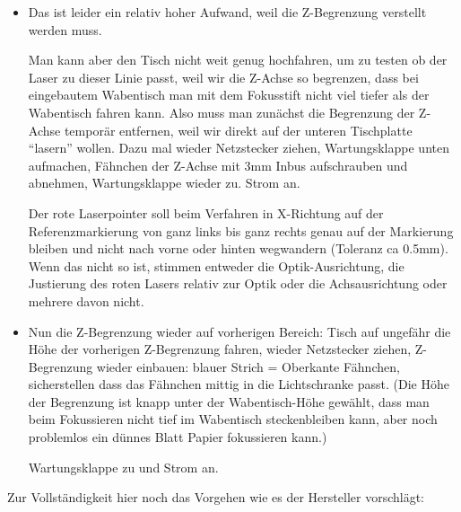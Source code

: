 \documentclass{\basedir/fablab-document}
\begin{document}
	\begin{itemize}
		\item Das ist leider ein relativ hoher Aufwand, weil die Z-Begrenzung verstellt werden muss.
		
		Man kann aber den Tisch nicht weit genug hochfahren, um zu testen ob der Laser zu dieser Linie passt, weil wir die Z-Achse so begrenzen, dass bei eingebautem Wabentisch man mit dem Fokusstift nicht viel tiefer als der Wabentisch fahren kann. Also muss man zunächst die Begrenzung der Z-Achse temporär entfernen, weil wir direkt auf der unteren Tischplatte \enquote{lasern} wollen. Dazu mal wieder Netzstecker ziehen, Wartungsklappe unten aufmachen, Fähnchen der Z-Achse mit 3mm Inbus aufschrauben und abnehmen, Wartungsklappe wieder zu. Strom an.
		
		Der rote Laserpointer soll beim Verfahren in X-Richtung auf der Referenzmarkierung von ganz links bis ganz rechts genau auf der Markierung bleiben und nicht nach vorne oder hinten wegwandern (Toleranz ca 0.5mm). Wenn das nicht so ist, stimmen entweder die Optik-Ausrichtung, die Justierung des roten Lasers relativ zur Optik oder die Achsausrichtung oder mehrere davon nicht.
		
		\item Nun die Z-Begrenzung wieder auf vorherigen Bereich: Tisch auf ungefähr die Höhe der vorherigen Z-Begrenzung fahren, wieder Netzstecker ziehen, Z-Begrenzung wieder einbauen: blauer Strich = Oberkante Fähnchen, sicherstellen dass das Fähnchen mittig in die Lichtschranke passt. (Die Höhe der Begrenzung ist knapp unter der Wabentisch-Höhe gewählt, dass man beim Fokussieren nicht tief im Wabentisch steckenbleiben kann, aber noch problemlos ein dünnes Blatt Papier fokussieren kann.)
		
		Wartungsklappe zu und Strom an.
	\end{itemize}

Zur Vollständigkeit hier noch das Vorgehen wie es der Hersteller vorschlägt:
\end{document}

